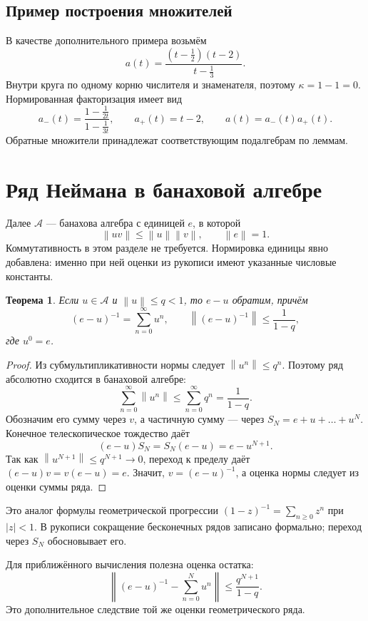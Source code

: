 \documentclass[12pt,a4paper]{article}
\newtheorem{theorem}{Теорема}
\theoremstyle{definition}
\theoremstyle{remark}
\newcommand{\norm}[1]{\left\lVert #1\right\rVert}
\begin{document}
\subsection{Пример построения множителей}

В качестве дополнительного примера возьмём
\[
  a(t)=\frac{(t-\tfrac12)(t-2)}{t-\tfrac13}.
\]
Внутри круга по одному корню числителя и знаменателя, поэтому
$\kappa=1-1=0$. Нормированная факторизация имеет вид
\[
  a_-(t)=\frac{1-\tfrac1{2t}}{1-\tfrac1{3t}},\qquad
  a_+(t)=t-2,\qquad a(t)=a_-(t)a_+(t).
\]
Обратные множители принадлежат соответствующим подалгебрам по леммам.

\section{Ряд Неймана в банаховой алгебре}

Далее $\mathcal A$ --- банахова алгебра с единицей $e$, в которой
\[
  \norm{uv}\leqslant\norm{u}\norm{v},\qquad \norm{e}=1.
\]
Коммутативность в этом разделе не требуется. Нормировка единицы
явно добавлена: именно при ней оценки из рукописи имеют указанные
числовые константы.

\begin{theorem}
Если $u\in\mathcal A$ и $\norm{u}\leqslant q<1$, то $e-u$ обратим,
причём
\[
  \boxed{(e-u)^{-1}=\sum_{n=0}^{\infty}u^n},\qquad
  \boxed{\norm{(e-u)^{-1}}\leqslant\frac1{1-q}},
\]
где $u^0=e$.
\end{theorem}

\begin{proof}
Из субмультипликативности нормы следует $\norm{u^n}\leqslant q^n$.
Поэтому ряд абсолютно сходится в банаховой алгебре:
\[
  \sum_{n=0}^{\infty}\norm{u^n}\leqslant\sum_{n=0}^{\infty}q^n
  =\frac1{1-q}.
\]
Обозначим его сумму через $v$, а частичную сумму --- через
$S_N=e+u+\dots+u^N$. Конечное телескопическое тождество даёт
\[
  (e-u)S_N=S_N(e-u)=e-u^{N+1}.
\]
Так как $\norm{u^{N+1}}\leqslant q^{N+1}\to0$, переход к пределу
даёт $(e-u)v=v(e-u)=e$. Значит, $v=(e-u)^{-1}$, а оценка нормы
следует из оценки суммы ряда.
\end{proof}

Это аналог формулы геометрической прогрессии
$(1-z)^{-1}=\sum_{n\geqslant0}z^n$ при $|z|<1$.
В рукописи сокращение бесконечных рядов записано формально;
переход через $S_N$ обосновывает его.

Для приближённого вычисления полезна оценка остатка:
\[
  \left\lVert(e-u)^{-1}-\sum_{n=0}^{N}u^n\right\rVert
  \leqslant\frac{q^{N+1}}{1-q}.
\]
Это дополнительное следствие той же оценки геометрического ряда.
\end{document}
